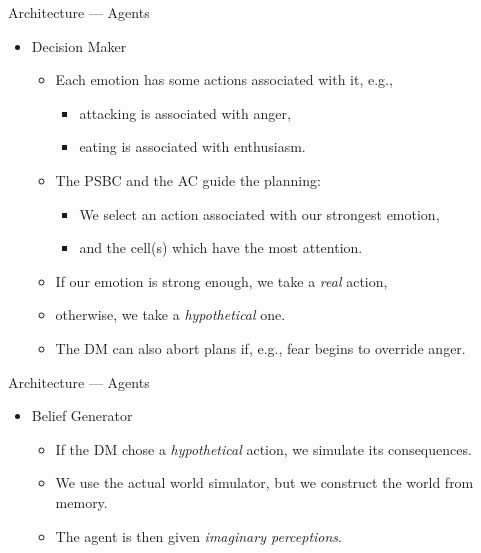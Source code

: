 \documentclass{beamer}
\def\tikzoverlay{%
   \tikz[baseline,overlay]\node[every overlay node]
}%
\begin{document}
   \begin{frame}{Architecture --- Agents}
      \begin{itemize}
         \item Decision Maker
            \begin{itemize}
               \item Each emotion has some actions associated with it, e.g.,
               \begin{itemize}
                  \item attacking is associated with anger,
                  \item eating is associated with enthusiasm.
               \end{itemize}
               \pause
               \item The PSBC and the AC guide the planning:
               \begin{itemize}
                  \item We select an action associated with our strongest emotion,
                  \item and the cell(s) which have the most attention.
               \end{itemize}
               \pause
               \item If our emotion is strong enough, we take a \emph{real} action,
               \item otherwise, we take a \emph{hypothetical} one.
               \vspace{2mm}
               \item The DM can also abort plans if, e.g., fear begins to override anger.
            \end{itemize}
      \end{itemize}
      
   \end{frame}
   
   \begin{frame}{Architecture --- Agents}
      \begin{itemize}
         \item Belief Generator
         \begin{itemize}
            \item If the DM chose a \emph{hypothetical} action, we simulate its consequences.
            \item We use the actual world simulator, but we construct the world from memory.
            \item The agent is then given \emph{imaginary perceptions}.
         \end{itemize}
      \end{itemize}
      
   \end{frame}
   
\end{document}
